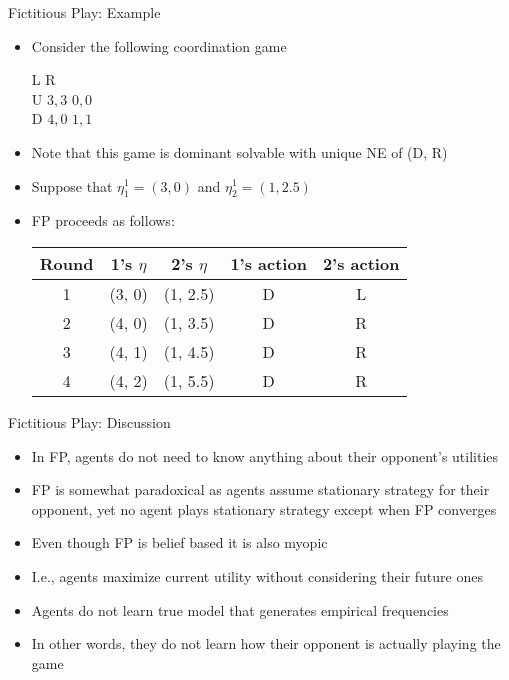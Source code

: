 \documentclass[11pt,aspectratio=169]{beamer}
\begin{document}
  
  \begin{frame}{Fictitious Play: Example}
   \begin{itemize}[<+->]
    \item Consider the following coordination game
    \begin{center}\scriptsize
     \hspace{-3.5em}
     \begin{game}{2}{2}
      	\> L		\> R		\\
      U	\> $3,3$	\> $0,0$	\\
      D	\> $4,0$	\> $1,1$
     \end{game}
    \end{center}
    \vspace{1em}
    \item Note that this game is dominant solvable with unique NE of (D, R)
    \item Suppose that $\eta_1^1 = (3, 0)$ and $\eta_2^1 = (1, 2.5)$
    \item FP proceeds as follows:
    \vspace{1em}
    \begin{center}
     \begin{tabular}{ccccc}
      Round	& 1's $\eta$	& 2's $\eta$	& 1's action	& 2's action			\\ \hline
      1		& (3, 0)		& (1, 2.5) 	& D			& L			\pause	\\
      2		& (4, 0)		& (1, 3.5) 	& D			& R			\pause	\\
      3		& (4, 1)		& (1, 4.5) 	& D			& R			\pause	\\
      4		& (4, 2)		& (1, 5.5) 	& D			& R					\\
     \end{tabular}
    \end{center}
   \end{itemize}
  \end{frame}
  
  
  \begin{frame}{Fictitious Play: Discussion}
   \begin{itemize}[<+->]
   \setlength{\itemsep}{1.2em}
    \item In FP, agents \alert{do not} need to know anything about their opponent's utilities
    \item FP is somewhat paradoxical as agents assume stationary strategy for their opponent, yet no agent plays stationary strategy except when FP converges
    \item Even though FP is \alert{belief based} it is also \alert{myopic}
    \item I.e., agents maximize current utility without considering their future ones
    \item Agents do not learn \alert{true model} that generates empirical frequencies
    \item In other words, they do not learn how their opponent is actually playing the game
   \end{itemize}
  \end{frame}
  
\end{document}
